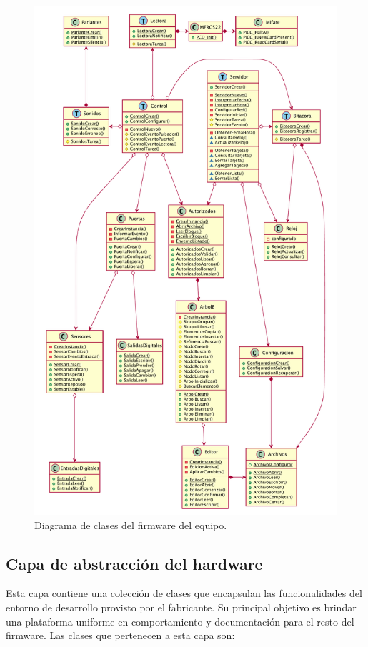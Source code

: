 \begin{figure}[H]
	\centering
	\includegraphics[width=\textwidth]{./Figures/PNK-DC002.pdf}
	\caption[Diagrama de clases del firmware del equipo]{Diagrama de clases del firmware del equipo.}
	\label{fig:DiagramaClases}
\end{figure}

\subsection{Capa de abstracción del hardware}

Esta capa contiene una colección de clases que encapsulan las funcionalidades del entorno de desarrollo provisto por el fabricante. Su principal objetivo es brindar una plataforma uniforme en comportamiento y documentación para el resto del firmware. Las clases que pertenecen a esta capa son:


